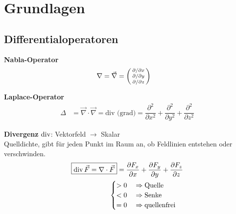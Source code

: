 \section{Grundlagen}
\subsection{Differentialoperatoren}
\textbf{Nabla-Operator}
\begin{align*}
    \nabla & = \vec{\nabla} = 
    \begin{psmallmatrix}
        \partial  / \partial x \\
        \partial  / \partial y \\
        \partial  / \partial z
    \end{psmallmatrix}
\end{align*}

\textbf{Laplace-Operator}
\begin{align*}
    \varDelta  & = \vec{\nabla} \cdot \vec{\nabla} = \textrm{div (grad)} = 
    \dfrac{\partial ^2}{\partial x^2}+\dfrac{\partial ^2}{\partial y^2}+\dfrac{\partial ^2}{\partial z^2}
\end{align*}

\textbf{Divergenz} $\operatorname{div}$: Vektorfeld $\rightarrow$ Skalar\\
\small{Quelldichte, gibt für jeden Punkt im Raum an, ob Feldlinien entstehen oder verschwinden.}
\begin{align*}
    \boxed{\operatorname{div} \vec{F} = \nabla \cdot \vec{F}}   =  \dfrac{\partial F_x}{\partial x} 
    + \dfrac{\partial F_y}{\partial y} + \dfrac{\partial F_z}{\partial z}\\ 
                                 \begin{cases}
    > 0 \quad\Rightarrow \textnormal{Quelle}  \\
    < 0 \quad\Rightarrow \textnormal{Senke} \\
    = 0 \quad\Rightarrow \textnormal{quellenfrei} 
\end{cases}                                      
\end{align*}\\

